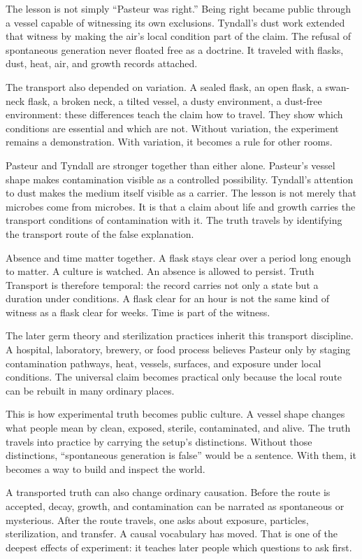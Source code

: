 The lesson is not simply ``Pasteur was right.'' Being right became public
through a vessel capable of witnessing its own exclusions. Tyndall's dust
work extended that witness by making the air's local condition part of the
claim. The refusal of spontaneous generation never floated free as a
doctrine. It traveled with flasks, dust, heat, air, and growth records
attached.

The transport also depended on variation. A sealed flask, an open flask, a
swan-neck flask, a broken neck, a tilted vessel, a dusty environment, a
dust-free environment: these differences teach the claim how to travel.
They show which conditions are essential and which are not. Without
variation, the experiment remains a demonstration. With variation, it
becomes a rule for other rooms.

Pasteur and Tyndall are stronger together than either alone. Pasteur's
vessel shape makes contamination visible as a controlled possibility.
Tyndall's attention to dust makes the medium itself visible as a carrier.
The lesson is not merely that microbes come from microbes. It is that a
claim about life and growth carries the transport conditions of
contamination with it. The truth travels by identifying the transport
route of the false explanation.

Absence and time matter together. A flask stays clear over a period long
enough to matter. A culture is watched. An absence is allowed to persist.
Truth Transport is therefore temporal: the record carries not only a state
but a duration under conditions. A flask clear for an hour is not the same
kind of witness as a flask clear for weeks. Time is part of the witness.

The later germ theory and sterilization practices inherit this transport
discipline. A hospital, laboratory, brewery, or food process believes
Pasteur only by staging contamination pathways, heat, vessels, surfaces,
and exposure under local conditions. The universal claim becomes practical
only because the local route can be rebuilt in many ordinary places.

This is how experimental truth becomes public culture. A vessel shape
changes what people mean by clean, exposed, sterile, contaminated, and
alive. The truth travels into practice by carrying the setup's
distinctions. Without those distinctions, ``spontaneous generation is
false'' would be a sentence. With them, it becomes a way to build and
inspect the world.

A transported truth can also change ordinary causation. Before the route
is accepted, decay, growth, and contamination can be narrated as
spontaneous or mysterious. After the route travels, one asks about
exposure, particles, sterilization, and transfer. A causal vocabulary has
moved. That is one of the deepest effects of experiment: it teaches later
people which questions to ask first.

